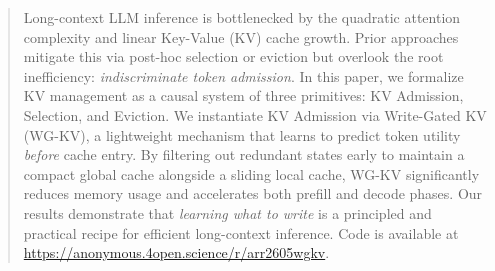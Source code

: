 \begin{abstract}
Long-context LLM inference is bottlenecked by the quadratic attention complexity and linear Key-Value (KV) cache growth. Prior approaches mitigate this via post-hoc selection or eviction but overlook the root inefficiency: \textit{indiscriminate token admission}. In this paper, we formalize KV management as a causal system of three primitives: KV Admission, Selection, and Eviction. We instantiate KV Admission via Write-Gated KV (WG-KV), a lightweight mechanism that learns to predict token utility \textit{before} cache entry. By filtering out redundant states early to maintain a compact global cache alongside a sliding local cache, WG-KV significantly reduces memory usage and accelerates both prefill and decode phases. Our results demonstrate that \textit{learning what to write} is a principled and practical recipe for efficient long-context inference. Code is available at \url{https://anonymous.4open.science/r/arr2605wgkv}.
\end{abstract}